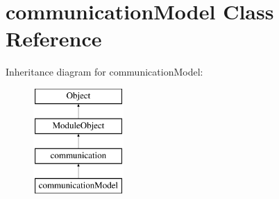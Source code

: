 \hypertarget{classcommunicationModel}{\section{communication\-Model Class Reference}
\label{classcommunicationModel}
}
Inheritance diagram for communication\-Model\-:\begin{figure}[H]
\begin{center}
\leavevmode
\includegraphics[height=4.000000cm]{classcommunicationModel}
\end{center}
\end{figure}
